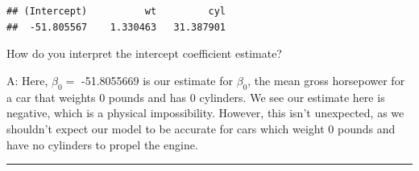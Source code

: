 \documentclass[]{book}
\begin{document}
\begin{verbatim}
## (Intercept)          wt         cyl 
##  -51.805567    1.330463   31.387901
\end{verbatim}

How do you interpret the intercept coefficient estimate?

A: Here, \(\hat\beta_{0} =\) -51.8055669 is our estimate for \(\beta_{0}\), the mean gross horsepower for a car that weights 0 pounds and has 0 cylinders. We see our estimate here is negative, which is a physical impossibility. However, this isn't unexpected, as we shouldn't expect our model to be accurate for cars which weight 0 pounds and have no cylinders to propel the engine.

\begin{center}\rule{0.5\linewidth}{\linethickness}\end{center}
\end{document}

